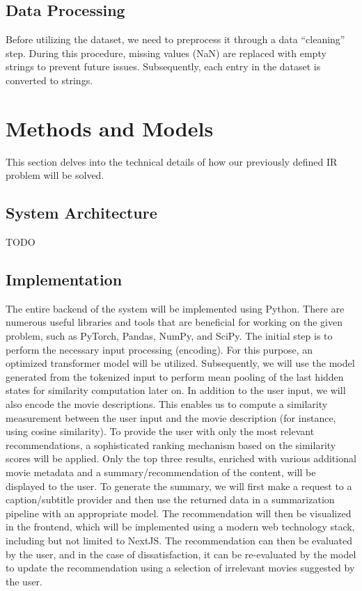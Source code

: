\documentclass[11pt,a4paper]{article}
\begin{document}
  \subsection{Data Processing}

  Before utilizing the dataset, we need to preprocess it through a data ``cleaning'' step.
  During this procedure, missing values (NaN) are replaced with empty strings to prevent future issues.
  Subsequently, each entry in the dataset is converted to strings.

  \section{Methods and Models}

  This section delves into the technical details of how our previously defined IR problem will be solved.

  \subsection{System Architecture}

  TODO

  \subsection{Implementation}

  The entire backend of the system will be implemented using Python.
  There are numerous useful libraries and tools that are beneficial for working on the given problem, such as PyTorch, Pandas, NumPy, and SciPy.
  The initial step is to perform the necessary input processing (encoding).
  For this purpose, an optimized transformer model will be utilized.
  Subsequently, we will use the model generated from the tokenized input to perform mean pooling of the last hidden states for similarity computation later on.
  In addition to the user input, we will also encode the movie descriptions.
  This enables us to compute a similarity measurement between the user input and the movie description (for instance, using cosine similarity).
  To provide the user with only the most relevant recommendations, a sophisticated ranking mechanism based on the similarity scores will be applied.
  Only the top three results, enriched with various additional movie metadata and a summary/recommendation of the content, will be displayed to the user.
  To generate the summary, we will first make a request to a caption/subtitle provider and then use the returned data in a summarization pipeline with an appropriate model.
  The recommendation will then be visualized in the frontend, which will be implemented using a modern web technology stack, including but not limited to NextJS.
  The recommendation can then be evaluated by the user, and in the case of dissatisfaction, it can be re-evaluated by the model to update the recommendation using a selection of irrelevant movies suggested by the user.
\end{document}
